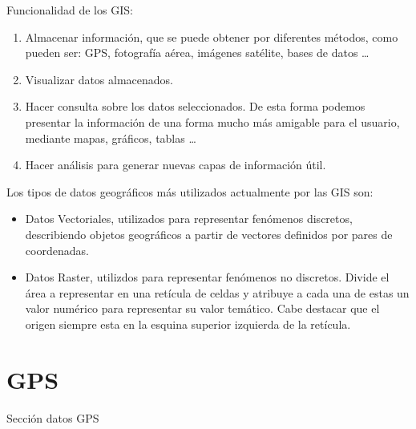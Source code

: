 Funcionalidad de los GIS:
\begin{enumerate}
\item Almacenar información, que se puede obtener por diferentes métodos, como pueden ser: GPS, fotografía aérea, imágenes satélite, bases de datos \ldots
\item Visualizar datos almacenados.
\item Hacer consulta sobre los datos seleccionados. De esta forma podemos presentar la información de una forma mucho más amigable para el usuario, mediante mapas, gráficos, tablas \ldots
\item Hacer análisis para generar nuevas capas de información útil.
\end{enumerate}

Los tipos de datos geográficos más utilizados actualmente por las GIS son:
\begin{itemize}
\item Datos Vectoriales, utilizados para representar fenómenos discretos, describiendo objetos geográficos a partir de vectores definidos por pares de coordenadas.
\item Datos Raster, utilizdos para representar fenómenos no discretos. Divide el área a representar en una retícula de celdas y atribuye a cada una de estas un valor numérico para representar su valor temático. Cabe destacar que el origen siempre esta en la esquina superior izquierda de la retícula.
\end{itemize}


\section{GPS}
Sección datos GPS